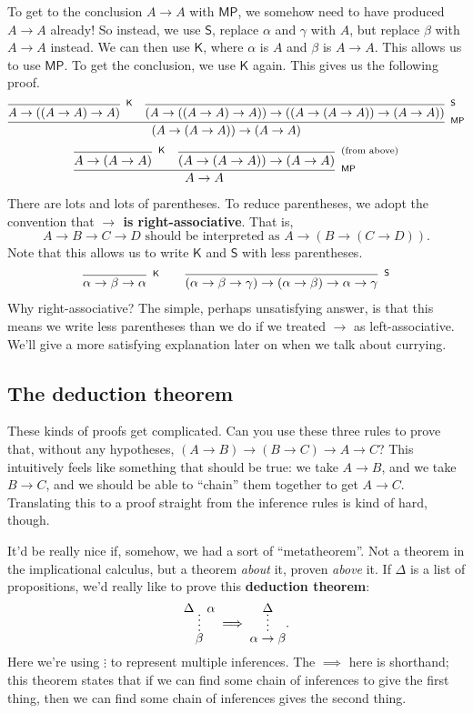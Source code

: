\documentclass[11pt,paper=letter]{scrartcl}
\newcommand{\sf}{\mathsf}
\newcommand{\vc}[1]{\vcenter{\hbox{#1}}}
\begin{document}
To get to the conclusion $A \to A$ with $\sf{MP}$, we somehow need to have produced $A \to A$ already! So instead, we use $\sf{S}$, replace $\alpha$ and $\gamma$ with $A$, but replace $\beta$ with $A \to A$ instead. We can then use $\sf{K}$, where $\alpha$ is $A$ and $\beta$ is $A \to A$. This allows us to use $\sf{MP}$. To get the conclusion, we use $\sf{K}$ again. This gives us the following proof.
\begin{align*}
\infer[^\sf{MP}]
{(A \to (A \to A)) \to (A \to A)}
{
  \infer[^\sf{K}]
  {A \to ((A \to A) \to A)}
  {}
  &
  \infer[^\sf{S}]
  {(A \to ((A \to A) \to A)) \to ((A \to (A \to A)) \to (A \to A))}
  {}
}
\end{align*}
\begin{align*}
\infer[^\sf{MP}]
{A \to A}
{
  \infer[^\sf{K}]
  {A \to (A \to A)}
  {}
  &
  \infer[^\text{(from above)}]
  {(A \to (A \to A)) \to (A \to A)}
  {}
}
\end{align*}
There are lots and lots of parentheses. To reduce parentheses, we adopt the convention that \textbf{$\mathbf{\to}$ is right-associative}. That is, \[
  A \to B \to C \to D \text{ should be interpreted as } A \to (B \to (C \to D)).
\]
Note that this allows us to write $\sf{K}$ and $\sf{S}$ with less parentheses.
\begin{align*}
\infer[^\sf{K}]
{\alpha \to \beta \to \alpha}
{}
\qquad
\infer[^\sf{S}]
{(\alpha \to \beta \to \gamma) \to (\alpha \to \beta) \to \alpha \to \gamma}
{}
\end{align*}
Why right-associative? The simple, perhaps unsatisfying answer, is that this means we write less parentheses than we do if we treated $\to$ as left-associative. We'll give a more satisfying explanation later on when we talk about currying.

\subsection{The deduction theorem}

These kinds of proofs get complicated. Can you use these three rules to prove that, without any hypotheses, $(A \to B) \to (B \to C) \to A \to C$? This intuitively feels like something that should be true: we take $A \to B$, and we take $B \to C$, and we should be able to ``chain'' them together to get $A \to C$. Translating this to a proof straight from the inference rules is kind of hard, though.

It'd be really nice if, somehow, we had a sort of ``metatheorem''. Not a theorem in the implicational calculus, but a theorem \emph{about} it, proven \emph{above} it. If $\Delta$ is a list of propositions, we'd really like to prove this \textbf{deduction theorem}:
\begin{align*}
\vc{\infer*
{\beta}
{\Delta & \alpha}}
\implies
\vc{\infer*
{\alpha \to \beta}
{\Delta}}.
\end{align*}
Here we're using $\vdots$ to represent multiple inferences. The $\implies$ here is shorthand; this theorem states that if we can find some chain of inferences to give the first thing, then we can find some chain of inferences gives the second thing.
\end{document}
